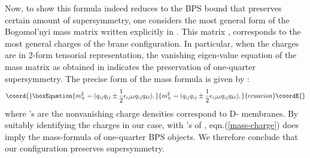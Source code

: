 \documentclass[a4paper,12pt,fleqn,cite,epsfig]{article}
\begin{document}
Now, to show this formula indeed reduces to the BPS bound
that preserves certain amount of supersymmetry, one considers 
the most general form of the Bogomol'nyi mass matrix written 
explicitly in \cite{pope}. This matrix \cite{pope}, corresponds
to the most general charges of the brane configuration. In particular,
when the charges are in 2-form tensorial representation, 
the vanishing eigen-value equation of the mass matrix as obtained in 
\cite{myers1} indicates the preservation of one-quarter supersymmetry. 
The precise form of the mass formula \cite{myers1} is given by : 
\begin{equation}\coord{}\boxEquation{
m_{\pm}^2 = (q_{i j} q_{i j} \pm {1\over 2}\epsilon_{i j k l}q_{i
  j}q_{k l}), 
}{
m_{\pm}^2 = (q_{i j} q_{i j} \pm {1\over 2}\epsilon_{i j k l}q_{i
  j}q_{k l}), 
}{ecuacion}\coordE{}\end{equation}
where \coordHE{}'s are the nonvanishing charge densities
correspond to D- membranes.
By suitably identifying the charges in our case, with \coordHE{}'s 
of \cite{myers1}, eqn.(\ref{mass-charge}) does imply the mass-formula
of one-quarter BPS objects. We therefore conclude that our
configuration preserves \coordHE{} supersymmetry.
\end{document}
